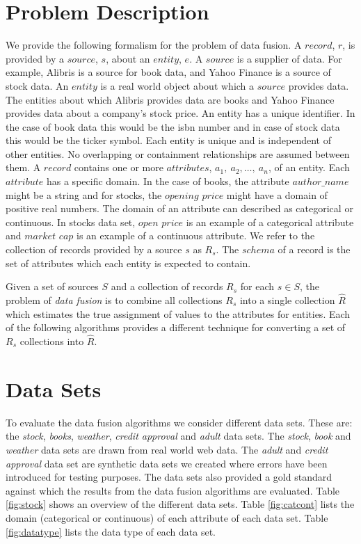 \documentclass{acm_proc_article-sp}
\begin{document}
\section{Problem Description}
We provide the following formalism for the problem of data fusion. A $record$, $r$, is provided by a $source$, $s$, about an $entity$, $e$. A $source$ is a supplier of data. For example, Alibris is a source for book data, and Yahoo Finance is a source of stock data.  An $entity$ is a real world object about which a $source$ provides data. The entities about which Alibris provides data are books and Yahoo Finance provides data about a company's stock price. An entity has a unique identifier. In the case of book data this would be the isbn number and in case of stock data this would be the ticker symbol. Each entity is unique and is independent of other entities. No overlapping or containment relationships are assumed between them. A $record$ contains one or more $attributes$, $a_1,\ a_2,\dots,\ a_n$, of an entity. Each $attribute$ has a specific domain. In the case of books, the attribute $author\_name$ might be a string and for stocks, the $opening$ $price$ might have a domain of positive real numbers.  The domain of an attribute can described as categorical or continuous. In stocks data set, $open$ $price$ is an example of a categorical attribute and $market$ $cap$  is an example of a continuous attribute. We refer to the collection of records provided by a source $s$ as $R_s$. The $schema$ of a record is the set of attributes which each entity is expected to contain. 


Given a set of sources $S$ and a collection of records $R_s$ for each $s \in S$, the problem of \emph{data fusion} is to combine all collections $R_s$ into a single collection $\hat{R}$ which estimates the true assignment of values to the attributes for entities.  Each of the following algorithms provides a different technique for converting a set of $R_s$ collections into $\hat{R}$. 

\section{Data Sets} \label{sec:data_sets}
To evaluate the data fusion algorithms we consider different data sets. These are: the \emph{stock}, \emph{books}, \emph{weather}, \emph{credit approval} and \emph{adult} data sets. The \emph{stock}, \emph{book} and \emph{weather} data sets are drawn from real world web data. The \emph{adult} and \emph{credit approval} data set are synthetic data sets we created where errors have been introduced for testing purposes. The data sets also provided a gold standard against which the results from the data fusion algorithms are evaluated. Table \ref{fig:stock} shows an overview of the different data sets. Table \ref{fig:catcont} lists the domain (categorical or continuous) of each attribute of each data set. Table \ref{fig:datatype} lists the data type of each data set.  \\
\end{document}
